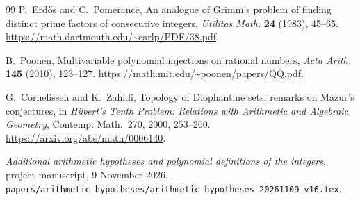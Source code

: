 \documentclass[11pt,a4paper]{article}
\theoremstyle{definition}\newtheorem{definition}[theorem]{Definition}
\theoremstyle{remark}\newtheorem{remark}[theorem]{Remark}
\begin{document}
\begin{thebibliography}{99}
P.~Erd\H{o}s and C.~Pomerance,
An analogue of Grimm's problem of finding distinct prime
factors of consecutive integers,
\emph{Utilitas Math.} \textbf{24} (1983), 45--65.
\url{https://math.dartmouth.edu/~carlp/PDF/38.pdf}.

B.~Poonen, Multivariable polynomial injections on rational numbers,
\emph{Acta Arith.} \textbf{145} (2010), 123--127.
\url{https://math.mit.edu/~poonen/papers/QQ.pdf}.

G.~Cornelissen and K.~Zahidi,
Topology of Diophantine sets: remarks on Mazur's conjectures,
in \emph{Hilbert's Tenth Problem: Relations with Arithmetic
and Algebraic Geometry}, Contemp. Math.~270, 2000, 253--260.
\url{https://arxiv.org/abs/math/0006140}.

\emph{Additional arithmetic hypotheses and polynomial definitions of the integers},
project manuscript, 9 November 2026,
\nolinkurl{papers/arithmetic_hypotheses/arithmetic_hypotheses_20261109_v16.tex}.
\end{thebibliography}
\end{document}
